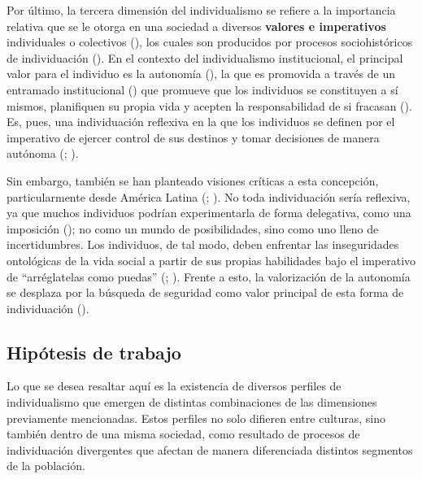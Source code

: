 \documentclass[
  letterpaper,
  DIV=11,
  numbers=noendperiod]{scrartcl}
\begin{document}
Por último, la tercera dimensión del individualismo se refiere a la
importancia relativa que se le otorga en una sociedad a diversos
\textbf{valores e imperativos} individuales o colectivos
(), los cuales son
producidos por procesos sociohistóricos de individuación
(). En el contexto del
individualismo institucional, el principal valor para el individuo es la
autonomía (), la que es
promovida a través de un entramado institucional
() que promueve que los
individuos se constituyen a sí mismos, planifiquen su propia vida y
acepten la responsabilidad de si fracasan
(). Es, pues, una individuación
reflexiva en la que los individuos se definen por el imperativo de
ejercer control de sus destinos y tomar decisiones de manera autónoma
(;
).

Sin embargo, también se han planteado visiones críticas a esta
concepción, particularmente desde América Latina
(;
). No toda individuación sería
reflexiva, ya que muchos individuos podrían experimentarla de forma
delegativa, como una imposición (); no como un mundo de posibilidades, sino como uno lleno
de incertidumbres. Los individuos, de tal modo, deben enfrentar las
inseguridades ontológicas de la vida social a partir de sus propias
habilidades bajo el imperativo de ``arréglatelas como puedas''
(;
). Frente a esto, la valorización
de la autonomía se desplaza por la búsqueda de seguridad como valor
principal de esta forma de individuación
().

\subsection*{Hipótesis de trabajo}\label{hipuxf3tesis-de-trabajo}

Lo que se desea resaltar aquí es la existencia de diversos perfiles de
individualismo que emergen de distintas combinaciones de las dimensiones
previamente mencionadas. Estos perfiles no solo difieren entre culturas,
sino también dentro de una misma sociedad, como resultado de procesos de
individuación divergentes que afectan de manera diferenciada distintos
segmentos de la población.
\end{document}
